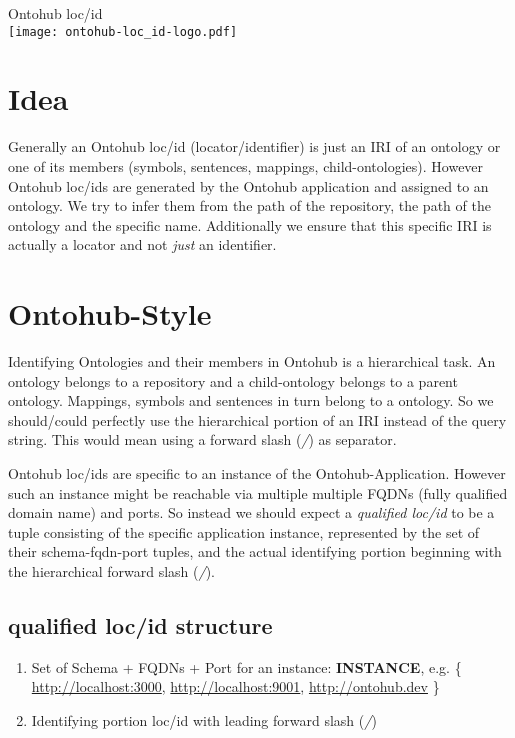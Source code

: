 \documentclass[a4paper,11pt,DIV=25]{scrartcl}
\author{Tim Reddehase}
\date{2014-09-13}
\begin{document}
\Huge
\begin{center}
  Ontohub loc/id\\
  \bigskip
  \texttt{[image: ontohub-loc\_id-logo.pdf]}
\end{center}
\normalsize

\bigskip

\section{Idea}

Generally an Ontohub loc/id (locator/identifier) is just an IRI of an ontology
or one of its members (symbols, sentences, mappings, child-ontologies). However
Ontohub loc/ids are generated by the Ontohub application and assigned to an
ontology.  We try to infer them from the path of the repository, the path of
the ontology and the specific name. Additionally we ensure that this specific
IRI is actually a locator and not \textit{just} an identifier.

\section{Ontohub-Style}

Identifying Ontologies and their members in Ontohub is a hierarchical task. An
ontology belongs to a repository and a child-ontology belongs to a parent
ontology. Mappings, symbols and sentences in turn belong to a ontology. So we
should/could perfectly use the hierarchical portion of an IRI instead of the
query string. This would mean using a forward slash (\textit{/}) as separator.

Ontohub loc/ids are specific to an instance of the Ontohub-Application. However
such an instance might be reachable via multiple multiple FQDNs (fully
qualified domain name) and ports. So instead we should expect a
\textit{qualified loc/id} to be a tuple consisting of the specific application
instance, represented by the set of their schema-fqdn-port tuples, and the
actual identifying portion beginning with the hierarchical forward slash
(\textit{/}).

\subsection{qualified loc/id structure}

\begin{enumerate}
  \item Set of Schema + FQDNs + Port for an instance: \textbf{INSTANCE}, e.g.
    \{ \url{http://localhost:3000}, \url{http://localhost:9001}, \url{http://ontohub.dev} \}
  \item Identifying portion loc/id with leading forward slash (\textit{/})
\end{enumerate}
\end{document}

